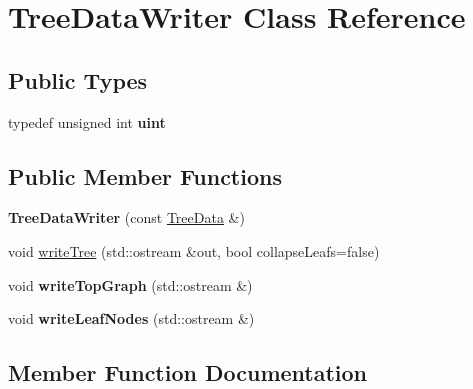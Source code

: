 \hypertarget{classTreeDataWriter}{}\section{Tree\+Data\+Writer Class Reference}
\label{classTreeDataWriter}
\subsection*{Public Types}
\begin{DoxyCompactItemize}
\item 
\mbox{\label{classTreeDataWriter_a1ee80675e8b1b75f54025fd5f9cec45f}} 
typedef unsigned int {\bfseries uint}
\end{DoxyCompactItemize}
\subsection*{Public Member Functions}
\begin{DoxyCompactItemize}
\item 
\mbox{\label{classTreeDataWriter_a9fbc9400c30bcae428a401a8525eb07e}} 
{\bfseries Tree\+Data\+Writer} (const \mbox{\hyperlink{classTreeData}{Tree\+Data}} \&)
\item 
void \mbox{\hyperlink{classTreeDataWriter_ad31058029c1cfbcc823aaf3aaa750dc7}{write\+Tree}} (std\+::ostream \&out, bool collapse\+Leafs=false)
\item 
\mbox{\label{classTreeDataWriter_a68a6d3d28c7d96e2e20de20f89f3c09b}} 
void {\bfseries write\+Top\+Graph} (std\+::ostream \&)
\item 
\mbox{\label{classTreeDataWriter_acda6566e26580f57e3d950cdd97fc00d}} 
void {\bfseries write\+Leaf\+Nodes} (std\+::ostream \&)
\end{DoxyCompactItemize}


\subsection{Member Function Documentation}
\mbox{\label{classTreeDataWriter_ad31058029c1cfbcc823aaf3aaa750dc7}} 
